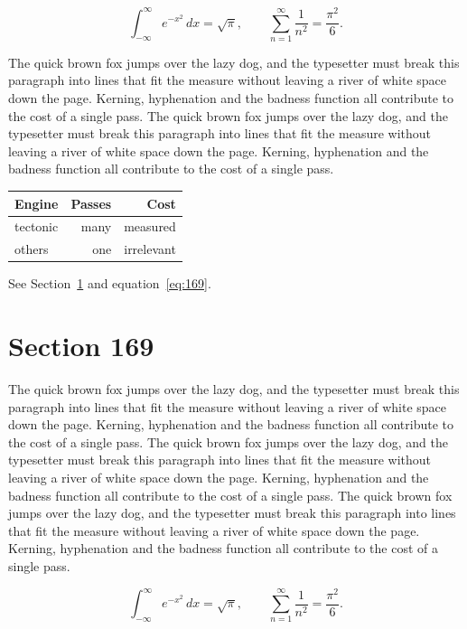 \documentclass{article}
\begin{document}
\begin{equation}\label{eq:168}
\int_{-\infty}^{\infty} e^{-x^{2}}\,dx = \sqrt{\pi}, \qquad
\sum_{n=1}^{\infty} \frac{1}{n^{2}} = \frac{\pi^{2}}{6}.
\end{equation}

The quick brown fox jumps over the lazy dog, and the typesetter must break this paragraph into lines that fit the measure without leaving a river of white space down the page. Kerning, hyphenation and the badness function all contribute to the cost of a single pass. The quick brown fox jumps over the lazy dog, and the typesetter must break this paragraph into lines that fit the measure without leaving a river of white space down the page. Kerning, hyphenation and the badness function all contribute to the cost of a single pass. 

\begin{center}
\begin{tabular}{lrr}
\toprule
Engine & Passes & Cost \\
\midrule
tectonic & many & measured \\
others & one & irrelevant \\
\bottomrule
\end{tabular}
\end{center}

See Section~\ref{sec:169} and equation~\eqref{eq:169}.
\section{Section 169}
\label{sec:169}
The quick brown fox jumps over the lazy dog, and the typesetter must break this paragraph into lines that fit the measure without leaving a river of white space down the page. Kerning, hyphenation and the badness function all contribute to the cost of a single pass. The quick brown fox jumps over the lazy dog, and the typesetter must break this paragraph into lines that fit the measure without leaving a river of white space down the page. Kerning, hyphenation and the badness function all contribute to the cost of a single pass. The quick brown fox jumps over the lazy dog, and the typesetter must break this paragraph into lines that fit the measure without leaving a river of white space down the page. Kerning, hyphenation and the badness function all contribute to the cost of a single pass. 

\begin{equation}\label{eq:169}
\int_{-\infty}^{\infty} e^{-x^{2}}\,dx = \sqrt{\pi}, \qquad
\sum_{n=1}^{\infty} \frac{1}{n^{2}} = \frac{\pi^{2}}{6}.
\end{equation}
\end{document}
